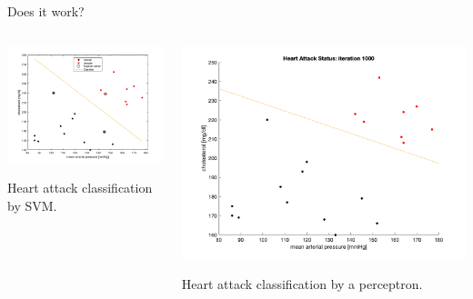 \documentclass[9pt]{beamer}
\begin{document}
\begin{frame}{Does it work?}

\begin{columns}
\begin{column}{0.5\textwidth}
	\begin{center}
		\includegraphics[width=\textwidth]{HeartAttackSVM}
		
		Heart attack classification by SVM. \newline
	\end{center}
\end{column}

\begin{column}{0.5\textwidth}
	\begin{center}
		\includegraphics[width=\textwidth]{HeartAttackPerceptron}
		
		Heart attack classification by a perceptron.
	\end{center}
\end{column}
	
\end{columns}

\end{frame}
\end{document}
